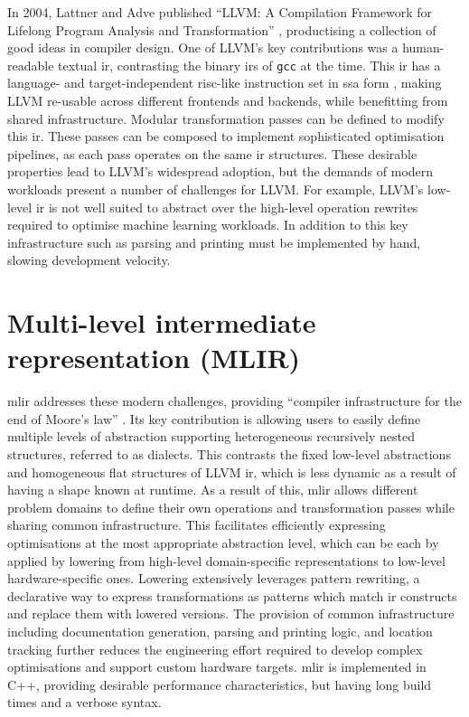 In 2004, Lattner and Adve published ``LLVM: A Compilation Framework for
Lifelong Program Analysis and Transformation'' \cite{lattnerLLVMCompilationFramework2004}, productising a collection of good ideas in compiler design.
One of LLVM's key contributions was a human-readable textual \ac{ir}, contrasting the binary \acp{ir} of \texttt{gcc} at the time. This \ac{ir} has a language- and target-independent \acs{risc}-like instruction set in \ac{ssa} form \cite{cytronEfficientlyComputingStatic1991}, making LLVM re-usable across different frontends and backends, while benefitting from shared infrastructure. Modular transformation passes can be defined to modify this \ac{ir}. These passes can be composed to implement sophisticated optimisation pipelines, as each pass operates on the same \ac{ir} structures.
These desirable properties lead to LLVM's widespread adoption, but the demands of modern workloads present a number of challenges for LLVM.
For example, LLVM's low-level \ac{ir} is not well suited to abstract over the high-level operation rewrites required to optimise machine learning workloads. In addition to this key infrastructure such as parsing and printing must be implemented by hand, slowing development velocity.

\section{Multi-level intermediate representation (MLIR)}
\label{sec:mlir}

\acf{mlir} addresses these modern challenges, providing ``compiler infrastructure for the end of Moore's law'' \cite{lattnerMLIRScalingCompiler2021a}.
Its key contribution is allowing users to easily define multiple levels of abstraction supporting heterogeneous recursively nested structures, referred to as dialects. This contrasts the fixed low-level abstractions and homogeneous flat structures of LLVM \ac{ir}, which is less dynamic as a result of having a shape known at runtime. As a result of this, \ac{mlir} allows different problem domains to define their own operations and transformation passes while sharing common infrastructure. This facilitates efficiently expressing optimisations at the most appropriate abstraction level, which can be each by applied by lowering from high-level domain-specific representations to low-level hardware-specific ones. Lowering extensively leverages pattern rewriting, a declarative way to express transformations as patterns which match \ac{ir} constructs and replace them with lowered versions.
The provision of common infrastructure including documentation generation, parsing and printing logic, and location tracking further reduces the engineering effort required to develop complex optimisations and support custom hardware targets.
\ac{mlir} is implemented in C++, providing desirable performance characteristics, but having long build times and a verbose syntax.

